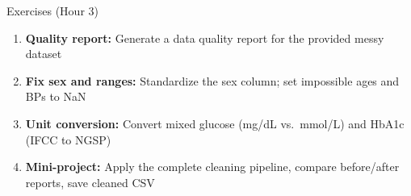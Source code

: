 \documentclass[aspectratio=169,11pt]{beamer}
\begin{document}
\begin{frame}{Exercises (Hour 3)}
\begin{enumerate}
  \item \textbf{Quality report:} Generate a data quality report for the provided messy dataset
  \item \textbf{Fix sex and ranges:} Standardize the sex column; set impossible ages and BPs to NaN
  \item \textbf{Unit conversion:} Convert mixed glucose (mg/dL vs.\ mmol/L) and HbA1c (IFCC to NGSP)
  \item \textbf{Mini-project:} Apply the complete cleaning pipeline, compare before/after reports, save cleaned CSV
\end{enumerate}
\end{frame}
\end{document}
